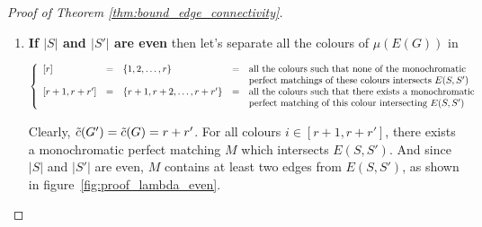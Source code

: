 \begin{proof}[Proof of Theorem \ref{thm:bound_edge_connectivity}]
\begin{enumerate}
            \begin{figure}[H]
                \caption{Existence of a crossing edge between $S$ and $S'$ in a perfect matching $M$ of $G$ if $|S|$ and $|S'|$ are odd.}
                \label{fig:proof_lambda_odd}
            \end{figure}
            
            Let $E(S, S')$ be the set of crossing edges from $S$ to $S'$.
            The maximum number of different monochromatic edges that can be found on $E(S, S')$ is at most $\lambda(G)$ (otherwise more edges would be needed).
            The conclusion is that the monochromatic perfect matchings of $G_\mu^w$ can be of a most $\lambda(G)$ different colours.
            Hence,
            
            \begin{center}
                $\Tilde{c}(G') = \Tilde{c}(G) \leq \lambda(G) \leq \lambda(G')$
            \end{center}
            
            This forms a contradiction with the statement that $\Tilde{c}(G') \geq \lambda(G') + 1$.
            
        \item
            \textbf{If $|S|$ and $|S'|$ are even} then let's separate all the colours of $\mu\left(E(G)\right)$ in
            
            \begin{center}
                $\left\{ \begin{array}{l c l c l}
                    [r]             & = & \{1, 2, \dots, r\}              & = & \mbox{all the colours such that none of the monochromatic} \\
                                    &   &                                 &   & \mbox{perfect matchings of these colours intersects } E(S, S') \\ 
                    {[r + 1, r + r']} & = & \{r + 1, r + 2, \dots, r + r'\} & = & \mbox{all the colours such that there exists a monochromatic} \\
                                    &   &                                 &   & \mbox{perfect matching of this colour intersecting } E(S, S')
                \end{array} \right.$
            \end{center}
            
            Clearly, $\Tilde{c}(G') = \Tilde{c}(G) = r + r'$.
            For all colours $i \in [r + 1, r + r']$, there exists a monochromatic perfect matching $M$ which intersects $E(S, S')$.
            And since $|S|$ and $|S'|$ are even, $M$ contains at least two edges from $E(S, S')$, as shown in figure~\ref{fig:proof_lambda_even}.
            

\end{enumerate}
\end{proof}
